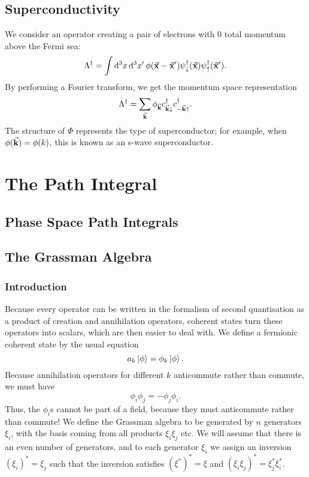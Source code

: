 \documentclass[twoside,symmetric, openany, 12pt]{./tuftebook}
\theoremstyle{definition}
\theoremstyle{definition}
\theoremstyle{definition}
\begin{document}
	\section{Superconductivity}
	We consider an operator creating a pair of electrons with 0 total momentum above the Fermi sea:
	\[
	\Lambda^\dagger = \int \dd[3]{x}\dd[3]{x'} \phi(\va x - \va{x}')\psi_{\downarrow}^\dagger(\va x)\psi_{\uparrow}^\dagger(\va{x}')
	.\] 
	By performing a Fourier transform, we get the momentum space representation
	\[
	\Lambda^\dagger = \sum_{\va k}\phi_{\va k}c_{\va k \downarrow}^\dagger c_{-\va k\uparrow}^\dagger
	.\] 
	The structure of $\Phi$ represents the type of superconductor; for example, when $\phi(\va k) = \phi(k)$, this is known as an s-wave superconductor.
	\chapter{The Path Integral}
	\section{Phase Space Path Integrals}
	\section{The Grassman Algebra}
	\subsection{Introduction}
	Because every operator can be written in the formalism of second quantisation as a product of creation and annihilation operators, coherent states turn these operators into scalars, which are then easier to deal with. We define a fermionic coherent state by the usual equation
	\[
		a_k \ket{\phi} = \phi_k \ket{\phi}
	.\] 
	Because annihilation operators for different $k$ anticommute rather than commute, we must have
	\[
	\phi_i \phi_j = -\phi_j\phi_i
	.\] 
	Thus, the $\phi_i$s cannot be part of a field, because they must anticommute rather than commute! We define the Grassman algebra to be generated by $n$ generators $\xi_i$, with the basis coming from all products $\xi_i\xi_j$ etc. We will assume that there is an even number of generators, and to each generator $\xi_i$ we assign an inversion $(\xi_i)^* = \xi_j$ such that the inversion satisfies $(\xi^*)^* = \xi$ and $(\xi_i\xi_j)^* = \xi_j^*\xi_i^*$. 
\end{document}
